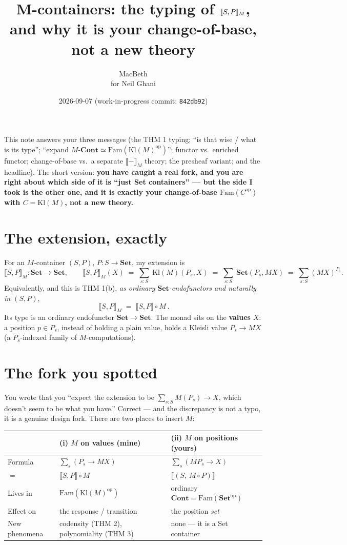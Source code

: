 \documentclass[11pt]{article}
\title{M-containers: the typing of $\ext{S,P}_M$,\\ and why it is your change-of-base, not a new theory}
\author{MacBeth \\ \small for Neil Ghani}
\date{2026-09-07 \quad\small (work-in-progress commit: \texttt{842db92})}
\newcommand{\Set}{\mathbf{Set}}
\newcommand{\Cont}{\mathbf{Cont}}
\newcommand{\Kl}{\mathrm{Kl}}
\newcommand{\Fam}{\mathrm{Fam}}
\newcommand{\ext}[1]{\llbracket #1 \rrbracket}
\theoremstyle{definition}
\begin{document}
\maketitle

\noindent This note answers your three messages (the THM 1 typing; ``is that wise / what is its
type''; ``expand $M\text{-}\Cont \simeq \Fam(\Kl(M)^{\mathrm{op}})$''; functor vs.\ enriched functor;
change-of-base vs.\ a separate $\ext{-}_M$ theory; the presheaf variant; and the headline). The short
version: \textbf{you have caught a real fork, and you are right about which side of it is ``just Set
containers'' --- but the side I took is the other one, and it is exactly your change-of-base
$\Fam(C^{\mathrm{op}})$ with $C=\Kl(M)$, not a new theory.}

\section{The extension, exactly}
For an $M$-container $(S,P)$, $P:S\to\Set$, my extension is
\[
  \ext{S,P}_M : \Set \to \Set,
  \qquad
  \ext{S,P}_M(X) \;=\; \sum_{s:S}\ \Kl(M)(P_s, X)
  \;=\; \sum_{s:S}\ \Set(P_s, MX)
  \;=\; \sum_{s:S} (MX)^{P_s}.
\]
Equivalently, and this is THM 1(b), \emph{as ordinary $\Set$-endofunctors and naturally in $(S,P)$},
\[
  \boxed{\ \ext{S,P}_M \;=\; \ext{S,P}\circ M\ }.
\]
Its type is an ordinary endofunctor $\Set\to\Set$. The monad sits on the \textbf{values} $X$: a position
$p\in P_s$, instead of holding a plain value, holds a Kleisli value $P_s \to MX$ (a $P_s$-indexed family
of $M$-computations).

\section{The fork you spotted}
You wrote that you ``expect the extension to be $\sum_{s:S} M(P_s)\to X$, which doesn't seem to be what
you have.'' Correct --- and the discrepancy is not a typo, it is a genuine design fork. There are two
places to insert $M$:

\begin{center}
\begin{tabular}{@{}lll@{}}
\toprule
 & \textbf{(i) $M$ on values (mine)} & \textbf{(ii) $M$ on positions (yours)} \\
\midrule
Formula & $\sum_{s}(P_s \to MX)$ & $\sum_{s}(M P_s \to X)$ \\
$=$ & $\ext{S,P}\circ M$ & $\ext{(S,\,M\circ P)}$ \\
Lives in & $\Fam(\Kl(M)^{\mathrm{op}})$ & ordinary $\Cont=\Fam(\Set^{\mathrm{op}})$ \\
Effect on & the response / transition & the position \emph{set} \\
New phenomena & codensity (THM 2), polynomiality (THM 3) & none --- it is a Set container \\
\bottomrule
\end{tabular}
\end{center}
\end{document}
